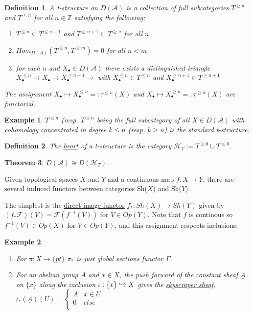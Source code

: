 \documentclass{book}
\newtheorem{theorem}{Theorem}[section]
\newtheorem{definition}[theorem]{Definition}
\newtheorem{example}{Example}[section]
\begin{document}
\begin{definition}
A \underline{t-structure} on $D(\mathcal{A})$ is a collection of full subcategories $T^{\geq n}$ and $T^{\leq n}$ for all $n\in \mathbb{Z}$ satisfying the following:
\begin{enumerate}
\item $T^{\leq n} \subseteq T^{\leq n+1}$ and $T^{\geq n+1} \subseteq T^{\geq n}$ for all $n$ 
\item $Hom_{D(\mathcal{A})}(T^{\leq n}, T^{\geq m})=0$ for all $n<m$ 
\item for each $n$ and $X_{\bullet} \in D(\mathcal{A})$ there exists a distinguished triangle $X_{\bullet}^{\leq n} \rightarrow X_{\bullet} \rightarrow X_{\bullet}^{\geq n+1} \rightarrow $ with $X_{\bullet}^{\leq n} \in T^{\leq n}$ and $ X_{\bullet}^{\geq n+1} \in  T^{\geq n+1}$
\end{enumerate}
The assignment $X_{\bullet} \mapsto X_{\bullet}^{\leq n} =: \tau^{\leq n}(X)$ and $X_{\bullet} \mapsto X_{\bullet}^{\geq n} =: \tau^{\geq n}(X)$ are functorial. 
\end{definition}

\begin{example}
$T^{\leq n}$ (resp. $T^{\geq n}$ being the full subcategory of all $X \in D(\mathcal{A})$ with cohomology concentrated in degree $k\leq n$ (resp. $k\geq n$) is the \underline{standard t-structure}. 
\end{example}

\begin{definition}
The \underline{heart} of a t-structure is the category $\mathcal{H}_T :=T^{\geq 0} \cup T^{\leq 0}.$
\end{definition}

\begin{theorem}
$D(\mathcal{A})\cong D(\mathcal{H}_T)$. 
\end{theorem}

Given topological spaces $X$ and $Y$ and a continuous map $f:X\rightarrow Y$, there are several induced functors between categories Sh($X$) and Sh($Y$). 

The simplest is the \underline{direct image functor} $f_*:Sh(X) \rightarrow Sh(Y)$ given by $(f_* \mathcal{F} )(V) = \mathcal{F}(f^{-1}(V))$ for $V\in Op(Y)$.
Note that $f$ is continous so $f^{-1}(V) \in Op(X)$ for $V\in Op(Y)$, and this assignment respects inclusions. 

\begin{example}
\begin{enumerate}
\item For $\pi :X \rightarrow \{ pt \}$ $\pi_*$ is just global sections functor $\Gamma$.
\item For an abelian group $A$ and $x\in X$, the push forward of the constant sheaf $\underline{A}$ on $\{x\}$ along the inclusion $\iota : \{ x \} \xhookrightarrow{} X$ gives the \underline{skyscraper sheaf},  $ \iota_* (\underline{A})(U) = \left\{
\begin{array}{ll}
      A & x\in U \\
      0 & else \\
\end{array} 
\right.$
\end{enumerate}
\end{example}
\end{document}
